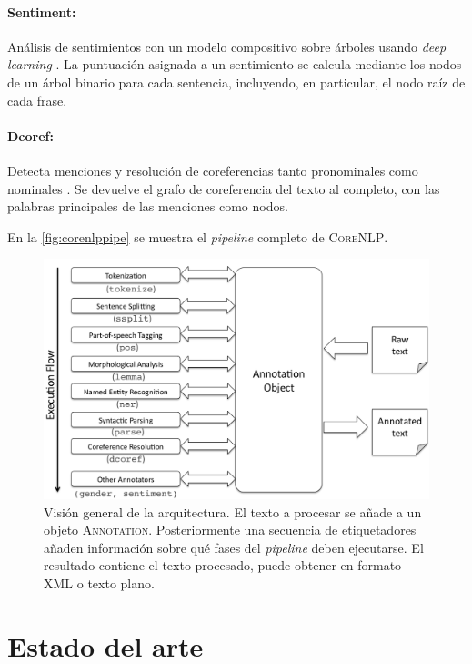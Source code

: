 \paragraph{Sentiment:} Análisis de sentimientos con un modelo compositivo sobre
árboles usando \emph{deep learning} \cite{socher2013}. La puntuación asignada a
un sentimiento se calcula mediante los nodos de un árbol binario para cada
sentencia, incluyendo, en particular, el nodo raíz de cada frase.

\paragraph{Dcoref:} Detecta menciones y resolución de coreferencias tanto pronominales como
nominales \cite{Lee2013}. Se devuelve el grafo de coreferencia del texto al
completo, con las palabras principales de las menciones como nodos.

En la \autoref{fig:corenlppipe} se muestra el \emph{pipeline} completo de \textsc{CoreNLP}.

\begin{figure}[bth]
  \includegraphics[width=1\linewidth]{gfx/corenlppipe.png}
  \caption[Visualización del \emph{pipeline} de \textsc{CoreNLP}]{Visión general
    de la arquitectura. El texto a procesar se añade a un objeto
    \textsc{Annotation}. Posteriormente una secuencia de etiquetadores añaden
    información sobre qué fases del \emph{pipeline} deben ejecutarse. El
    resultado contiene el texto procesado, puede obtener en formato \ac{XML} o
    texto plano.}
  \label{fig:corenlppipe}
\end{figure}

\section{Estado del arte}
\label{sec:stateoftheart}


